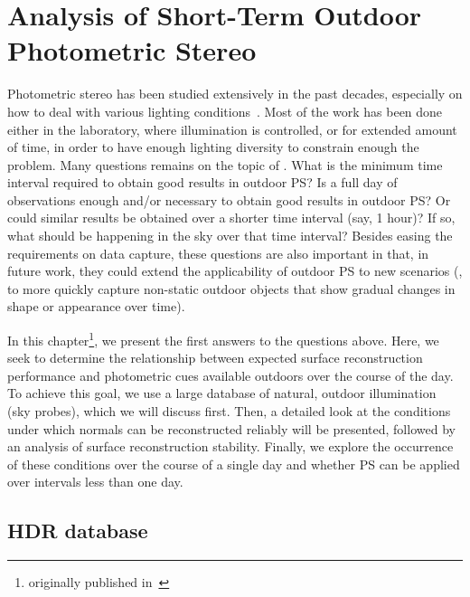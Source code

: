 \chapter{Analysis of Short-Term Outdoor Photometric Stereo}     %

\label{ch1}

Photometric stereo has been studied extensively in the past decades, especially on how to deal with various lighting conditions~\cite{alldrin-cvpr-08,basri-ijcv-07,johnson-cvpr-11,oxholm-eccv-12,ackermann-cvpr-12,abrams-eccv-12}. Most of the work has been done either in the laboratory, where illumination is controlled, or for extended amount of time, in order to have enough lighting diversity to constrain enough the problem. Many questions remains on the topic of . What is the minimum time interval required to obtain good results in outdoor PS? Is a full day of observations enough and/or necessary to obtain good results in outdoor PS? Or could similar results be obtained over a shorter time interval (say, 1 hour)? If so, what should be happening in the sky over that time interval? Besides easing the requirements on data capture, these questions are also important in that, in future work, they could extend the applicability of outdoor PS to new scenarios (\eg, to more quickly capture non-static outdoor objects that show gradual changes in shape or appearance over time).


In this chapter\footnote{originally published in~\cite{holdgeoffroy-iccp-15,holdgeoffroy-3dv-15}}, we present the first answers to the questions above. Here, we seek to determine the relationship between expected surface reconstruction performance and photometric cues available outdoors over the course of the day. To achieve this goal, we use a large database of natural, outdoor illumination (sky probes), which we will discuss first. Then, a detailed look at the conditions under which normals can be reconstructed reliably will be presented, followed by an analysis of surface reconstruction stability. Finally, we explore the occurrence of these conditions over the course of a single day and whether PS can be applied over intervals less than one day.

\section{HDR database}
\label{sec:hdrdb}


